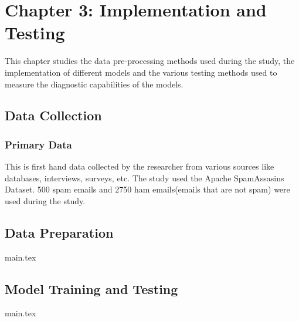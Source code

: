 \section{Chapter 3: Implementation and Testing}
This chapter studies the data pre-processing methods used during the study, the implementation of different models and the various testing methods used to measure the diagnostic capabilities of the models.

\subsection{Data Collection}
\subsubsection{Primary Data}
This is first hand data collected by the researcher from various sources like databases, interviews, surveys, etc. The study used the Apache SpamAssasins Dataset. 500 spam emails and 2750 ham emails(emails that are not spam) were used during the study.

\subsection{Data Preparation}
{main.tex}

\subsection{Model Training and Testing}
{main.tex}